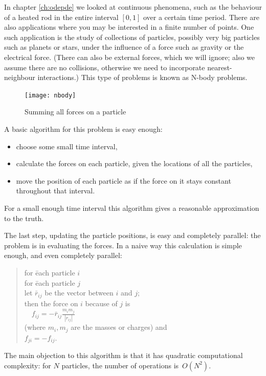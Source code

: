 
In chapter \ref{ch:odepde} we looked at continuous phenomena, such as
the behaviour of a heated rod in the entire interval $[0,1]$ over a
certain time period. There are also applications where you may be
interested in a finite number of points. One such application is the
study of collections of particles, possibly very big particles such as
planets or stars, under the influence of a force such as gravity or
the electrical force. (There can also be external forces, which we
will ignore; also we assume there are no collisions, otherwise we need
to incorporate nearest-neighbour interactions.) This type of problems
is known as N-body problems.

\begin{figure}
\texttt{[image: nbody]}
\caption{Summing all forces on a particle}
\hbox{}\kern-1.5in\hbox{}
\end{figure}
%
A basic algorithm for this problem is easy enough:
\begin{itemize}
\item choose some small time interval,
\item calculate the forces on each particle, given the locations of
  all the particles,
\item move the position of each particle as if the force on it stays
  constant throughout that interval.
\end{itemize}
For a small enough time interval this algorithm gives a reasonable approximation to the truth. 

The last step, updating the particle positions, is easy and completely
parallel: the problem is in evaluating the forces. In a naive way this
calculation is simple enough, and even completely parallel:
\begin{quotation}
  \begin{tabbing}
    for \=each particle $i$\\
    \>for \= each particle $j$\\
    \>\> let $\bar r_{ij}$ be the vector between $i$ and $j$;\\
    \>\> then the force on $i$ because of $j$ is\\
    \>\> $\quad f_{ij} = -\bar r_{ij}\frac{m_im_j}{|r_{ij}|}$\\
    \>\> (where $m_i,m_j$ are the masses or charges) and\\
    \>\> $f_{ji}=-f_{ij}$.
  \end{tabbing}
\end{quotation}
The main objection to this algorithm is that it has quadratic computational
complexity: for $N$ particles, the number of operations is~$O(N^2)$.

